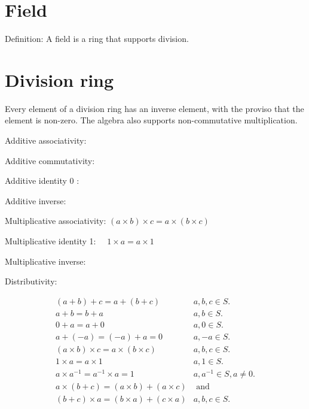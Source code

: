 \section{Field}
Definition: A field is a ring that supports division.

\section{Division ring}
Every element of a division ring has an inverse element, with the proviso that the element is non-zero. The algebra also supports non-commutative multiplication.

Additive associativity:

Additive commutativity:

Additive identity 0 :

Additive inverse:

Multiplicative associativity: $(a \times b) \times c=a \times(b \times c)$

Multiplicative identity 1: $\quad 1 \times a=a \times 1$

Multiplicative inverse:

Distributivity:

$$
\begin{array}{ll}
(a+b)+c=a+(b+c) & a, b, c \in S . \\
a+b=b+a & a, b \in S . \\
0+a=a+0 & a, 0 \in S . \\
a+(-a)=(-a)+a=0 & a,-a \in S . \\
(a \times b) \times c=a \times(b \times c) & a, b, c \in S . \\
1 \times a=a \times 1 & a, 1 \in S . \\
a \times a^{-1}=a^{-1} \times a=1 & a, a^{-1} \in S, a \neq 0 . \\
a \times(b+c)=(a \times b)+(a \times c) & \text { and } \\
(b+c) \times a=(b \times a)+(c \times a) & a, b, c \in S .
\end{array}
$$
